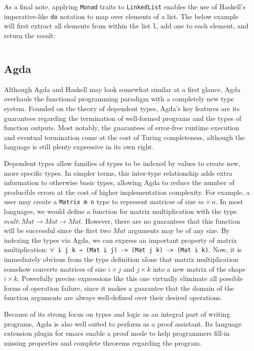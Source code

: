 \documentclass{article}
\begin{document}
As a final note, applying \texttt{Monad} traits to \texttt{LinkedList} enables the use of Haskell's imperative-like
\texttt{do} notation to map over elements of a list. The below example will first extract all elements from within
the list \texttt{l}, add one to each element, and return the result:
\inputminted{haskell}{linked_list/main_2.hs}

\subsection{Agda}

Although Agda and Haskell may look somewhat similar at a first glance, Agda overhauls the functional programming
paradigm with a completely new type system. Founded on the theory of dependent types, Agda's key features
are its guarantees regarding the termination of well-formed programs and the types of function outputs.
Most notably, the guarantees of error-free runtime execution and eventual termination
come at the cost of Turing completeness, although the language
is still plenty expressive in its own right.

Dependent types allow families of types to be indexed by values to create new, more specific types.
In simpler terms, this inter-type relationship adds extra information to otherwise basic types,
allowing Agda to reduce the number of producible errors at the cost of higher implementation complexity.
For example, a user may create a \texttt{Matrix m n} type to represent matrices of size $m\times n$.
In most languages, we would define a function for matrix multiplication with the type $mult: Mat \rightarrow Mat \rightarrow Mat$.
However, there are no guarantees that this function will be successful since the first two $Mat$ arguments
may be of any size. By indexing the types via Agda, we can express an important property of matrix multiplication:
\texttt{$\forall$ {i j k} → (Mat i j) -> (Mat j k) -> (Mat i k)}. Now, it is immediately obvious from the type definition alone
that matrix multiplication somehow converts matrices of size $i\times j$ and $j \times k$ into a new matrix of the shape $i \times k$.
Powerfully precise expressions like this one virtually eliminate all possible forms of operation failure,
since it makes a guarantee that the domain of the function arguments are always well-defined over their desired operations.

Because of its strong focus on types and logic as an integral part of writing programs, Agda is also well suited
to perform as a proof assistant. Its language extension plugin for emacs enable a proof mode
to help programmers fill-in missing properties and complete theorems regarding the program.
\end{document}
